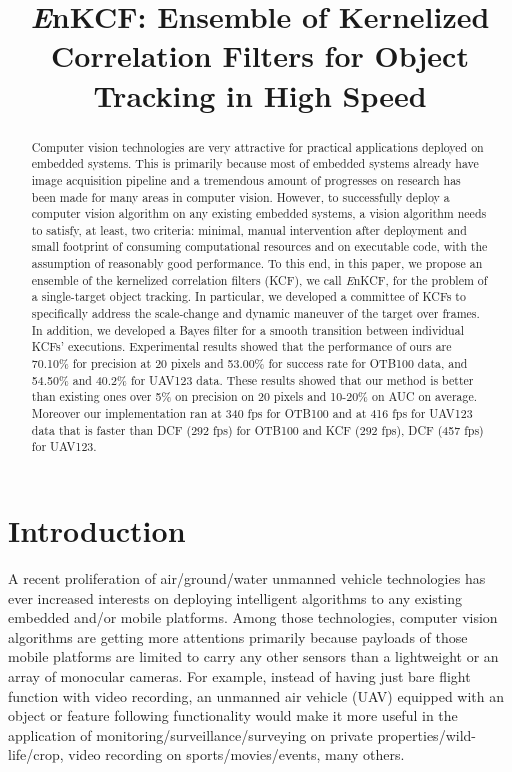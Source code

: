 \documentclass{bmvc2k}
\title{ {\it E}nKCF: Ensemble of Kernelized Correlation Filters for Object Tracking in High Speed}
\begin{document}
\maketitle

\begin{abstract}
Computer vision technologies are very attractive for practical
applications deployed on embedded systems. This is primarily because
most of embedded systems already have image acquisition pipeline and a
tremendous amount of progresses on research has been made for many
areas in computer vision. However, to successfully deploy a computer
vision algorithm on any existing embedded systems, a vision algorithm
needs to satisfy, at least, two criteria: minimal, manual intervention
after deployment and small footprint of consuming computational
resources and on executable code, with the assumption of reasonably
good performance. To this end, in this paper, we propose an ensemble
of the kernelized correlation filters (KCF), we call {\it E}nKCF, for
the problem of a single-target object tracking. In particular, we
developed a committee of KCFs to specifically address the scale-change
and dynamic maneuver of the target over frames. In addition, we
developed a Bayes filter for a smooth transition between individual
KCFs' executions. Experimental results showed that the performance of
ours are 70.10\% for precision at 20 pixels and 53.00\% for success
rate for OTB100 data, and 54.50\% and 40.2\% for UAV123 data. These
results showed that our method is better than existing ones over 5\%
on precision on 20 pixels and 10-20\% on AUC on average. Moreover our
implementation ran at 340 fps for OTB100 and at 416 fps for UAV123
data that is faster than DCF (292 fps) for OTB100 and KCF (292 fps),
DCF (457 fps) for UAV123.
\end{abstract}

\section{Introduction}
A recent proliferation of air/ground/water unmanned vehicle
technologies has ever increased interests on deploying intelligent
algorithms to any existing embedded and/or mobile platforms. Among
those technologies, computer vision algorithms are getting more
attentions primarily because payloads of those mobile platforms are
limited to carry any other sensors than a lightweight or an array of
monocular cameras. For example, instead of having just bare flight
function with video recording, an unmanned air vehicle (UAV) equipped
with an object or feature following functionality would make it more
useful in the application of monitoring/surveillance/surveying on
private properties/wild-life/crop, video recording on
sports/movies/events, many others.
\end{document}
